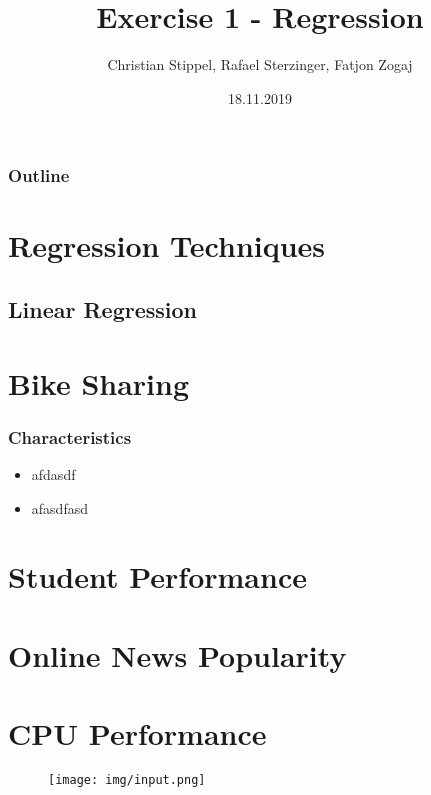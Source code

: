 \documentclass[aspectratio=169]{beamer}
\title[Your Short Title]{Exercise 1 - Regression}
\author{Christian Stippel, Rafael Sterzinger, Fatjon Zogaj}
\institute{Machine Learning}
\date{18.11.2019}
\begin{document}
\begin{frame}
  \titlepage
\end{frame}

\begin{frame}
\frametitle{Outline}
\tableofcontents
\end{frame}

\section{Regression Techniques}
\subsection{Linear Regression}

\section{Bike Sharing}

\begin{frame}{}
\frametitle{Characteristics}
\begin{itemize}
\item afdasdf
\item afasdfasd
\end{itemize}
\end{frame}

\section{Student Performance}

\section{Online News Popularity}

\section{CPU Performance}

\begin{frame}
\begin{figure}
    \centering
    \texttt{[image: img/input.png]}
\end{figure}
\end{frame}
\end{document}
